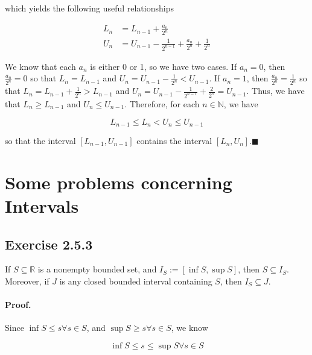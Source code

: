 \documentclass[paper=a4, fontsize=11pt]{scrartcl} %
\numberwithin{equation}{section} %
\numberwithin{figure}{section} %
\numberwithin{table}{section} %
\begin{document}
which yields the following useful relationships

\begin{align*}
L_n &= L_{n-1} + \frac{a_n}{2^n} \\
U_n &= U_{n-1} - \frac{1}{2^{n-1}} + \frac{a_n}{2^n} + \frac{1}{2^n}
\end{align*}

We know that each $a_n$ is either 0 or 1, so we have two cases. If $a_n = 0$, then $\frac{a_n}{2^n} = 0$ so that $L_n = L_{n-1}$ and $U_n = U_{n-1} - \frac{1}{2^n} < U_{n-1}$. If $a_n = 1$, then $\frac{a_n}{2^n} = \frac{1}{2^n}$ so that $L_n = L_{n-1} + \frac{1}{2^n} > L_{n-1}$ and $U_n = U_{n-1} - \frac{1}{2^{n-1}} + \frac{2}{2^n} = U_{n-1}$. Thus, we have that $L_n \geq L_{n-1}$ and $U_n \leq U_{n-1}$. Therefore, for each $n \in \mathbb{N}$, we have

\begin{equation}
L_{n-1} \leq L_n < U_n \leq U_{n-1}
\end{equation}

so that the interval $[L_{n-1},U_{n-1}]$ contains the interval $[L_n,U_n]$.$\blacksquare$\\


\section{Some problems concerning Intervals}

\subsection*{Exercise 2.5.3}

If $S \subseteq \mathbb{R}$ is a nonempty bounded set, and $I_S := [\inf S, \sup S]$, then $S \subseteq I_S$. Moreover, if $J$ is any closed bounded interval containing $S$, then $I_S \subseteq J$.\\

\paragraph{Proof.} Since $\inf S \leq s \forall s \in S$, and $\sup S \geq s \forall s \in S$, we know

\begin{equation}
\inf S \leq s \leq \sup S \forall s \in S
\end{equation}
\end{document}
